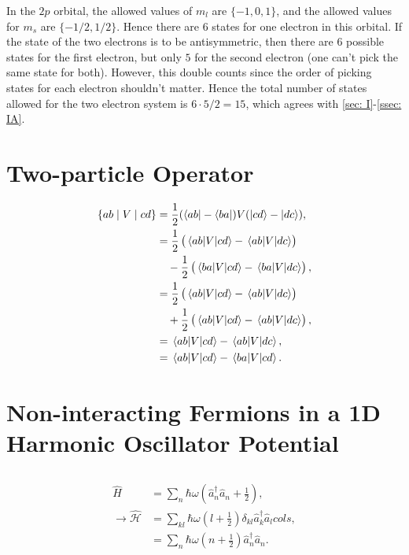\documentclass[
a4paper,
10pt,
twoside,
]{article}
\begin{document}
In the $2p$ orbital, the allowed values of $m_l$ are $\{-1,0,1\}$, and the allowed values for $m_s$ are $\{-1/2,1/2\}$.
Hence there are $6$ states for one electron in this orbital.
If the state of the two electrons is to be antisymmetric, then there are $6$ possible states for the first electron, but only $5$ for the second electron (one can't pick the same state for both).
However, this double counts since the order of picking states for each electron shouldn't matter.
Hence the total number of states allowed for the two electron system is $6\cdot 5 /2 = 15$, which agrees with \ref{sec: I}-\ref{ssec: IA}.






\section{Two-particle Operator}\label{sec: II}


\begin{align}
	\{ab\mid V\mid cd\}
		&= \frac{1}{2} (\bra{ab}-\bra{ba})V(\ket{cd}-\ket{dc}),\\
		&= \frac{1}{2} \left(\mel*{ab}{V}{cd}-\mel*{ab}{V}{dc}\right)\nonumber\\
			&\quad-\frac{1}{2}\left(\mel*{ba}{V}{cd}-\mel*{ba}{V}{dc}\right),\\
		&= \frac{1}{2} \left(\mel*{ab}{V}{cd}-\mel*{ab}{V}{dc}\right)\nonumber\\
			&\quad+\frac{1}{2} \left(\mel*{ab}{V}{cd}-\mel*{ab}{V}{dc}\right),\\
		&= \mel*{ab}{V}{cd}-\mel*{ab}{V}{dc},\\
		&= \mel*{ab}{V}{cd}-\mel*{ba}{V}{cd}.
\end{align}


\section{Non-interacting Fermions in a 1D Harmonic Oscillator Potential}\label{sec: III}
\subsection{}\label{ssec: IIIA}


\begin{align}
	\hat{H}
		&= \sum_{n} \hbar\omega\left(\hat{a}_n^\dagger \hat{a}_n + \frac{1}{2}\right),\\
	\rightarrow \hat{\mathcal{H}}
		&= \sum_{kl} \hbar\omega\left(l + \frac{1}{2}\right)\delta_{kl}\hat{a}_k^\dagger \hat{a}_lcols,\\
		&= \sum_{n} \hbar\omega\left(n + \frac{1}{2}\right)\hat{a}_n^\dagger \hat{a}_n.
\end{align}
\end{document}
